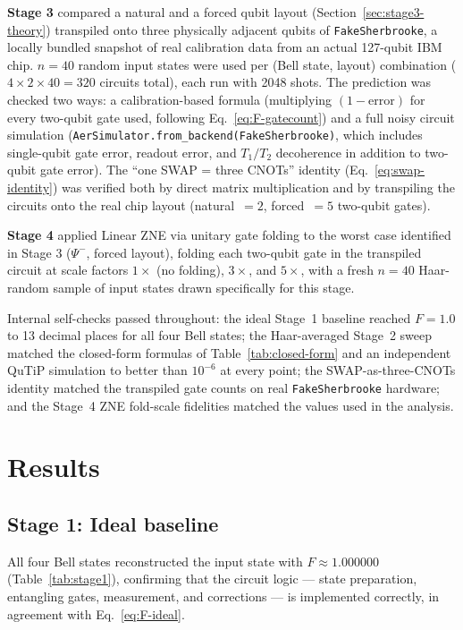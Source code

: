 \documentclass[11pt]{article}
\begin{document}
\textbf{Stage 3} compared a natural and a forced qubit layout (Section~\ref{sec:stage3-theory}) transpiled onto three physically adjacent qubits of \texttt{FakeSherbrooke}, a locally bundled snapshot of real calibration data from an actual 127-qubit IBM chip. $n=40$ random input states were used per (Bell state, layout) combination ($4\times2\times40=320$ circuits total), each run with 2048 shots. The prediction was checked two ways: a calibration-based formula (multiplying $(1-\text{error})$ for every two-qubit gate used, following Eq.~\eqref{eq:F-gatecount}) and a full noisy circuit simulation (\texttt{AerSimulator.from\_backend(FakeSherbrooke)}, which includes single-qubit gate error, readout error, and $T_1/T_2$ decoherence in addition to two-qubit gate error). The ``one SWAP = three CNOTs'' identity (Eq.~\eqref{eq:swap-identity}) was verified both by direct matrix multiplication and by transpiling the circuits onto the real chip layout (natural~$=2$, forced~$=5$ two-qubit gates).

\textbf{Stage 4} applied Linear ZNE via unitary gate folding to the worst case identified in Stage 3 ($\Psi^-$, forced layout), folding each two-qubit gate in the transpiled circuit at scale factors $1\times$ (no folding), $3\times$, and $5\times$, with a fresh $n=40$ Haar-random sample of input states drawn specifically for this stage.

Internal self-checks passed throughout: the ideal Stage~1 baseline reached $F=1.0$ to 13 decimal places for all four Bell states; the Haar-averaged Stage~2 sweep matched the closed-form formulas of Table~\ref{tab:closed-form} and an independent QuTiP simulation to better than $10^{-6}$ at every point; the SWAP-as-three-CNOTs identity matched the transpiled gate counts on real \texttt{FakeSherbrooke} hardware; and the Stage~4 ZNE fold-scale fidelities matched the values used in the analysis.

\section{Results}
\label{sec:results}

\subsection{Stage 1: Ideal baseline}

All four Bell states reconstructed the input state with $F\approx1.000000$ (Table~\ref{tab:stage1}), confirming that the circuit logic --- state preparation, entangling gates, measurement, and corrections --- is implemented correctly, in agreement with Eq.~\eqref{eq:F-ideal}.
\end{document}

